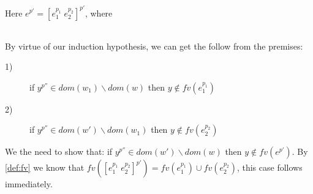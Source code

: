 \item[\runa{App-const}] Here $e^{p'}=[e_1^{p_1}\;e_2^{p_2}]^{p'}$, where
\begin{figure}[H]
	\setlength\tabcolsep{8pt}
	\begin{tabular}{l}
		
	\end{tabular}
\end{figure}
By virtue of our induction hypothesis, we can get the follow from the premises:
\begin{description}
	\item[1)] if $y^{p''}\in dom(w_1)\backslash dom(w)$ then $y\notin fv(e_1^{p_1})$
	\item[2)] if $y^{p''}\in dom(w')\backslash dom(w_1)$ then $y\notin fv(e_2^{p_2})$
\end{description}
We the need to show that: if $y^{p''}\in dom(w')\backslash dom(w)$ then $y\notin fv(e^{p'})$.
By \cref{def:fv} we know that $fv([e_1^{p_1}\;e_2^{p_2}]^{p'})=fv(e_1^{p_1})\cup fv(e_2^{p_2})$, this case follows immediately.
